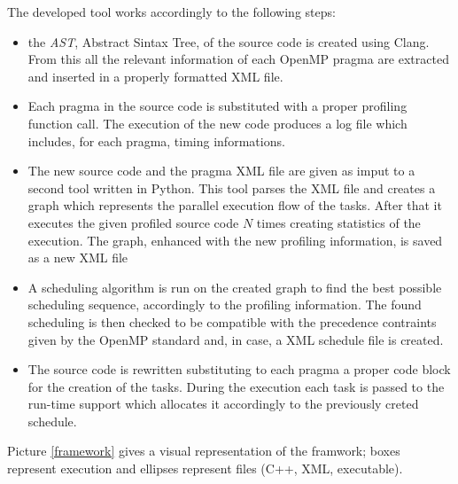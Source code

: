 \documentclass[a4paper,12pt,oneside]{book}
\begin{document}
The developed tool works accordingly to the following steps:
\begin{itemize}
\item{the \emph{AST}, Abstract Sintax Tree, of the source code is created using Clang. From this all the relevant information of each OpenMP pragma are extracted and inserted in a properly formatted XML file.}
\item{Each pragma in the source code is substituted with a proper profiling function call. The execution of the new code produces a log file which includes, for each pragma, timing informations.  }
\item{The new source code and the pragma XML file are given as imput to a second tool written in Python. This tool parses the XML file and creates a graph which represents the parallel execution flow of the tasks. After that it executes the given profiled source code $N$ times creating statistics of the execution. The graph, enhanced with the new profiling information, is saved as a new XML file}
\item{ A scheduling algorithm is run on the created graph to find the best possible scheduling sequence, accordingly to the profiling information. The found scheduling is then checked to be compatible with the precedence contraints given by the OpenMP standard and, in case, a XML schedule file is created.}
\item{ The source code is rewritten substituting to each pragma a proper code block for the creation of the tasks. During the execution each task is passed to the run-time support which allocates it accordingly to the previously creted schedule.}
\end{itemize}

Picture \ref{framework} gives a visual representation of the framwork; boxes represent execution and ellipses represent files (C++, XML, executable).
\end{document}
